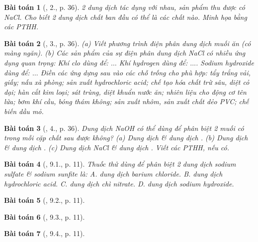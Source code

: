 \documentclass{article}
\newtheorem{baitoan}{Bài toán}
\begin{document}
\begin{baitoan}[\cite{SGK_Hoa_Hoc_9}, 2., p. 36]
	2 dung dịch tác dụng với nhau, sản phẩm thu được có \emph{NaCl}. Cho biết 2 dung dịch chất ban đầu có thể là các chất nào. Minh họa bằng các PTHH.
\end{baitoan}

\begin{baitoan}[\cite{SGK_Hoa_Hoc_9}, 3., p. 36]
	(a) Viết phương trình điện phân dung dịch muối ăn (có màng ngăn). (b) Các sản phẩm của sự điện phân dung dịch \emph{NaCl} có nhiều ứng dụng quan trọng: Khí clo dùng để: $\ldots$ Khí hydrogen dùng để: $\ldots$. Sodium hydroxide dùng để: $\ldots$ Điền các ứng dựng sau vào các chỗ trống cho phù hợp: tẩy trắng vải, giấy; nấu xà phòng; sản xuất hydrochloric acid; chế tạo hóa chất trừ sâu, diệt cỏ dại; hàn cắt kim loại; sát trùng, diệt khuẩn nước ăn; nhiên liệu cho động cơ tên lửa; bơm khí cầu, bóng thám không; sản xuất nhôm, sản xuất chất dẻo PVC; chế biến dầu mỏ.
\end{baitoan}

\begin{baitoan}[\cite{SGK_Hoa_Hoc_9}, 4., p. 36]
	Dung dịch \emph{NaOH} có thể dùng để phân biệt 2 muối có trong mỗi cặp chất sau được không? (a) Dung dịch \emph{} \& dung dịch \emph{}. (b) Dung dịch \emph{} \& dung dịch \emph{}. (c) Dung dịch \emph{NaCl} \& dung dịch \emph{}. Viết các PTHH, nếu có.
\end{baitoan}

\begin{baitoan}[\cite{SBT_Hoa_Hoc_9}, 9.1., p. 11]
	Thuốc thử dùng để phân biệt 2 dung dịch sodium sulfate \& sodium sunfite là: {\sf A.} dung dịch barium chloride. {\sf B.} dung dịch hydrochloric acid. {\sf C.} dung dịch chì nitrate. {\sf D.} dung dịch sodium hydroxide.
\end{baitoan}

\begin{baitoan}[\cite{SBT_Hoa_Hoc_9}, 9.2., p. 11]
	
\end{baitoan}

\begin{baitoan}[\cite{SBT_Hoa_Hoc_9}, 9.3., p. 11]
	
\end{baitoan}

\begin{baitoan}[\cite{SBT_Hoa_Hoc_9}, 9.4., p. 11]
	
\end{baitoan}
\end{document}
